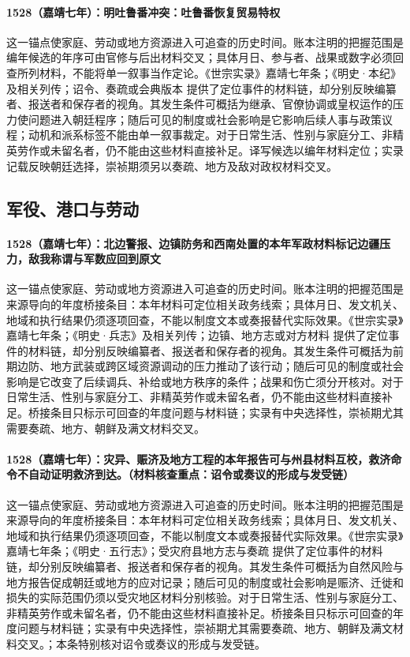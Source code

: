 \paragraph{1528（嘉靖七年）：明吐鲁番冲突：吐鲁番恢复贸易特权} 这一锚点使家庭、劳动或地方资源进入可追查的历史时间。账本注明的把握范围是编年候选的年序可由官修与后出材料交叉；具体月日、参与者、战果或数字必须回查所列材料，不能将单一叙事当作定论。《世宗实录》嘉靖七年条；《明史·本纪》及相关列传；诏令、奏疏或会典版本 提供了定位事件的材料链，却分别反映编纂者、报送者和保存者的视角。其发生条件可概括为继承、官僚协调或皇权运作的压力使问题进入朝廷程序；随后可见的制度或社会影响是它影响后续人事与政策议程；动机和派系标签不能由单一叙事裁定。对于日常生活、性别与家庭分工、非精英劳作或未留名者，仍不能由这些材料直接补足。译写候选以编年材料定位；实录记载反映朝廷选择，崇祯期须另以奏疏、地方及敌对政权材料交叉。

\subsection{军役、港口与劳动}

\paragraph{1528（嘉靖七年）：北边警报、边镇防务和西南处置的本年军政材料标记边疆压力，敌我称谓与军数应回到原文} 这一锚点使家庭、劳动或地方资源进入可追查的历史时间。账本注明的把握范围是来源导向的年度桥接条目：本年材料可定位相关政务线索；具体月日、发文机关、地域和执行结果仍须逐项回查，不能以制度文本或奏报替代实际效果。《世宗实录》嘉靖七年条；《明史·兵志》及相关列传；边镇、地方志或对方材料 提供了定位事件的材料链，却分别反映编纂者、报送者和保存者的视角。其发生条件可概括为前期边防、地方武装或跨区域资源调动的压力推动了该行动；随后可见的制度或社会影响是它改变了后续调兵、补给或地方秩序的条件；战果和伤亡须分开核对。对于日常生活、性别与家庭分工、非精英劳作或未留名者，仍不能由这些材料直接补足。桥接条目只标示可回查的年度问题与材料链；实录有中央选择性，崇祯期尤其需要奏疏、地方、朝鲜及满文材料交叉。

\paragraph{1528（嘉靖七年）：灾异、赈济及地方工程的本年报告可与州县材料互校，救济命令不自动证明救济到达。（材料核查重点：诏令或奏议的形成与发受链）} 这一锚点使家庭、劳动或地方资源进入可追查的历史时间。账本注明的把握范围是来源导向的年度桥接条目：本年材料可定位相关政务线索；具体月日、发文机关、地域和执行结果仍须逐项回查，不能以制度文本或奏报替代实际效果。《世宗实录》嘉靖七年条；《明史·五行志》；受灾府县地方志与奏疏 提供了定位事件的材料链，却分别反映编纂者、报送者和保存者的视角。其发生条件可概括为自然风险与地方报告促成朝廷或地方的应对记录；随后可见的制度或社会影响是赈济、迁徙和损失的实际范围仍须以受灾地区材料分别核验。对于日常生活、性别与家庭分工、非精英劳作或未留名者，仍不能由这些材料直接补足。桥接条目只标示可回查的年度问题与材料链；实录有中央选择性，崇祯期尤其需要奏疏、地方、朝鲜及满文材料交叉。；本条特别核对诏令或奏议的形成与发受链。

